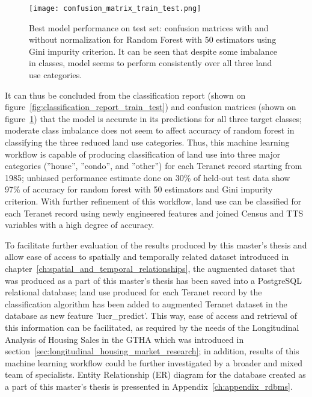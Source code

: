 \begin{figure}[hbt!]
    \centering
    \texttt{[image: confusion\_matrix\_train\_test.png]}
    \caption{Best model performance on test set: confusion matrices with and without normalization for Random Forest with 50 estimators using Gini impurity criterion.
    It can be seen that despite some imbalance in classes, model seems to perform consistently over all three land use categories.}
    \label{fig:confusion_matrix_train_test}
\end{figure}

It can thus be concluded from the classification report (shown on figure~\ref{fig:classification_report_train_test}) and confusion matrices (shown on figure~\ref{fig:confusion_matrix_train_test}) that the model is accurate in its predictions for all three target classes;
moderate class imbalance does not seem to affect accuracy of random forest in classifying the three reduced land use categories.
Thus, this machine learning workflow is capable of producing classification of land use into three major categories (''house'', ''condo'', and ''other'') for each Teranet record starting from 1985;
unbiased performance estimate done on 30\% of held-out test data show 97\% of accuracy for random forest with 50 estimators and Gini impurity criterion.
With further refinement of this workflow, land use can be classified for each Teranet record using newly engineered features and joined Census and TTS variables with a high degree of accuracy.

To facilitate further evaluation of the results produced by this master's thesis and allow ease of access to spatially and temporally related dataset introduced in chapter~\ref{ch:spatial_and_temporal_relationships}, the augmented dataset that was produced as a part of this master's thesis has been saved into a PostgreSQL relational database;
land use produced for each Teranet record by the classification algorithm has been added to augmented Teranet dataset in the database as new feature 'lucr\_predict'.
This way, ease of access and retrieval of this information can be facilitated, as required by the needs of the Longitudinal Analysis of Housing Sales in the GTHA which was introduced in section~\ref{sec:longitudinal_housing_market_research};
in addition, results of this machine learning workflow could be further investigated by a broader and mixed team of specialists.
Entity Relationship (ER) diagram for the database created as a part of this master's thesis is pressented in Appendix~\ref{ch:appendix_rdbms}.

